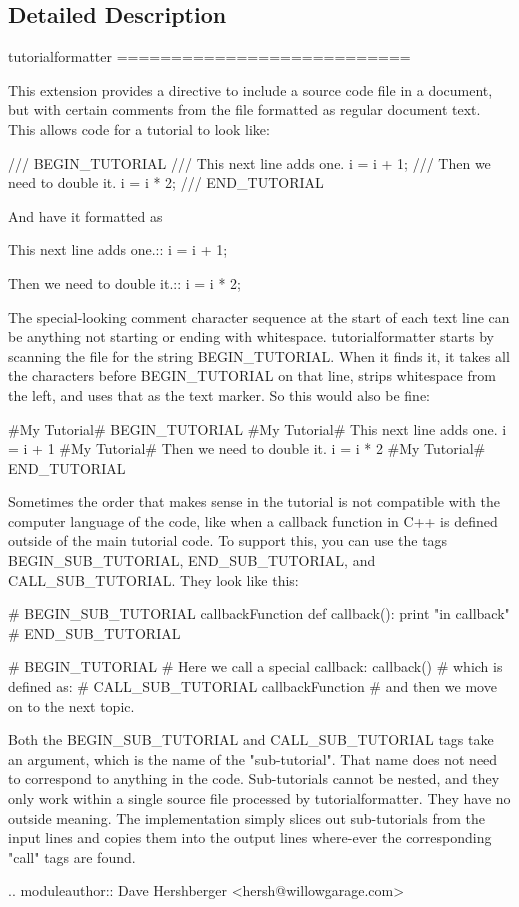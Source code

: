 \subsection{Detailed Description}
\begin{DoxyVerb}    tutorialformatter
    ===========================

    This extension provides a directive to include a source code file
    in a document, but with certain comments from the file formatted
    as regular document text.  This allows code for a tutorial to look like:

        /// BEGIN_TUTORIAL
        /// This next line adds one.
        i = i + 1;
        /// Then we need to double it.
        i = i * 2;
        /// END_TUTORIAL

    And have it formatted as

    This next line adds one.::
        i = i + 1;

    Then we need to double it.::
        i = i * 2;

    The special-looking comment character sequence at the start of
    each text line can be anything not starting or ending with
    whitespace.  tutorialformatter starts by scanning the file for the
    string BEGIN_TUTORIAL.  When it finds it, it takes all the
    characters before BEGIN_TUTORIAL on that line, strips whitespace
    from the left, and uses that as the text marker.  So this would
    also be fine:

        #My Tutorial# BEGIN_TUTORIAL
        #My Tutorial# This next line adds one.
        i = i + 1
        #My Tutorial# Then we need to double it.
        i = i * 2
        #My Tutorial# END_TUTORIAL

    Sometimes the order that makes sense in the tutorial is not
    compatible with the computer language of the code, like when a
    callback function in C++ is defined outside of the main tutorial
    code.  To support this, you can use the tags BEGIN_SUB_TUTORIAL,
    END_SUB_TUTORIAL, and CALL_SUB_TUTORIAL.  They look like this:

        # BEGIN_SUB_TUTORIAL callbackFunction
        def callback():
            print "in callback"
        # END_SUB_TUTORIAL

        # BEGIN_TUTORIAL
        # Here we call a special callback:
        callback()
        # which is defined as:
        # CALL_SUB_TUTORIAL callbackFunction
        # and then we move on to the next topic.

    Both the BEGIN_SUB_TUTORIAL and CALL_SUB_TUTORIAL tags take an
    argument, which is the name of the "sub-tutorial".  That name does
    not need to correspond to anything in the code.  Sub-tutorials
    cannot be nested, and they only work within a single source file
    processed by tutorialformatter.  They have no outside meaning.
    The implementation simply slices out sub-tutorials from the input
    lines and copies them into the output lines where-ever the
    corresponding "call" tags are found.

    .. moduleauthor::  Dave Hershberger <hersh@willowgarage.com>
\end{DoxyVerb}
 